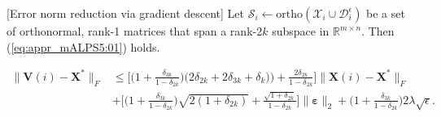 \documentclass[twocolumn]{svjour3}
\newcommand{\vectornormbig}[1]{\big\|#1\big\|}
\newcommand{\signal}{\boldsymbol{X}}
\newcommand{\bestsignal}{\boldsymbol{X}^\ast}
\newcommand{\noise}{\boldsymbol{\varepsilon}}
\newcommand{\dimension}{m \times n}
\newcommand{\rank}{k}
\begin{document}
\begin{lemma}{\label{lemma:appr_greedy}}[Error norm reduction via gradient descent] Let $ \mathcal{S}_i \leftarrow \text{ortho}(\mathcal{X}_i \cup \mathcal{D}_i^{\epsilon}) $ be a set of orthonormal, rank-1 matrices that span a rank-2$ \rank $ subspace in $ \mathbb{R}^{\dimension} $. Then (\ref{eq:appr_mALPS5:01}) holds.
\begin{figure*}[!htp]
\begin{align}
\vectornormbig{\boldsymbol{V}(i) - \bestsignal}_F &\leq \Bigg [ \Big( 1+ \frac{\delta_{3\rank}}{1-\delta_{2\rank}}\Big)\Big(2\delta_{2\rank} + 2\delta_{3\rank} + \delta_{\rank})\Big) + \frac{2\delta_{2\rank}}{1-\delta_{2\rank}}\Bigg] \vectornormbig{\signal(i) - \bestsignal}_F \nonumber \\
&+ \Big[ \big(1+ \frac{\delta_{3\rank}}{1-\delta_{2\rank}}\big)\sqrt{2(1+\delta_{2\rank})} + \frac{\sqrt{1+\delta_{2\rank}}}{1-\delta_{2\rank}}\Big]\vectornormbig{\noise}_2 + \big(1+ \frac{\delta_{3\rank}}{1-\delta_{2\rank}} \big)2\lambda \sqrt{\epsilon}. \label{eq:appr_mALPS5:01}
\end{align}
\hrulefill
\end{figure*}
\end{lemma}
\end{document}
